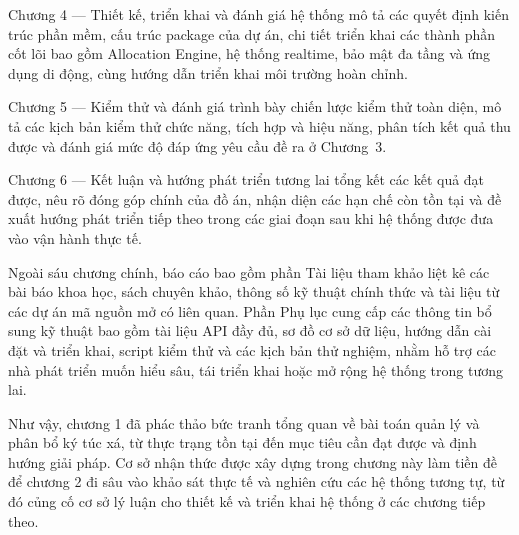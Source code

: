 \documentclass[../DoAn.tex]{subfiles}
\begin{document}
Chương 4 --- Thiết kế, triển khai và đánh giá hệ thống mô tả các quyết định
kiến trúc phần mềm, cấu trúc package của dự án, chi tiết triển khai các thành
phần cốt lõi bao gồm Allocation Engine, hệ thống realtime, bảo mật đa tầng và
ứng dụng di động, cùng hướng dẫn triển khai môi trường hoàn chỉnh.

Chương 5 --- Kiểm thử và đánh giá trình bày chiến lược kiểm thử toàn diện, mô
tả các kịch bản kiểm thử chức năng, tích hợp và hiệu năng, phân tích kết quả
thu được và đánh giá mức độ đáp ứng yêu cầu đề ra ở Chương~3.

Chương 6 --- Kết luận và hướng phát triển tương lai tổng kết các kết quả đạt
được, nêu rõ đóng góp chính của đồ án, nhận diện các hạn chế còn tồn tại và
đề xuất hướng phát triển tiếp theo trong các giai đoạn sau khi hệ thống được
đưa vào vận hành thực tế.

Ngoài sáu chương chính, báo cáo bao gồm phần Tài liệu tham khảo liệt kê các
bài báo khoa học, sách chuyên khảo, thông số kỹ thuật chính thức và tài liệu
từ các dự án mã nguồn mở có liên quan. Phần Phụ lục cung cấp các thông tin bổ
sung kỹ thuật bao gồm tài liệu API đầy đủ, sơ đồ cơ sở dữ liệu, hướng dẫn cài
đặt và triển khai, script kiểm thử và các kịch bản thử nghiệm, nhằm hỗ trợ các
nhà phát triển muốn hiểu sâu, tái triển khai hoặc mở rộng hệ thống trong tương
lai.

Như vậy, chương 1 đã phác thảo bức tranh tổng quan về bài toán quản lý và phân
bổ ký túc xá, từ thực trạng tồn tại đến mục tiêu cần đạt được và định hướng
giải pháp. Cơ sở nhận thức được xây dựng trong chương này làm tiền đề để chương
2 đi sâu vào khảo sát thực tế và nghiên cứu các hệ thống tương tự, từ đó củng
cố cơ sở lý luận cho thiết kế và triển khai hệ thống ở các chương tiếp theo.
\end{document}
